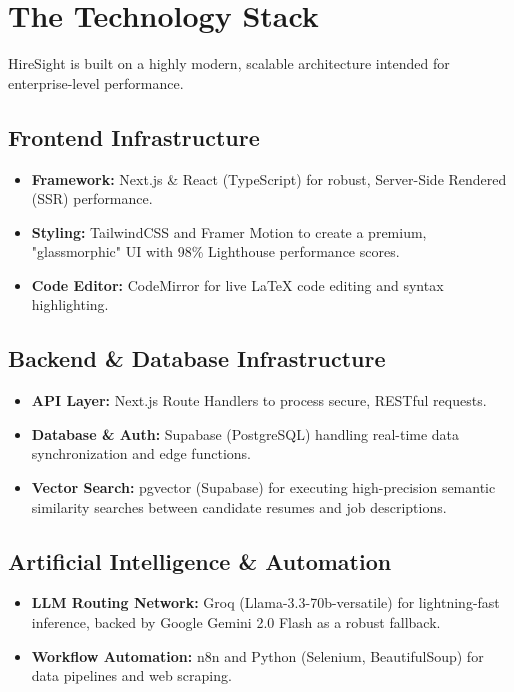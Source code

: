\documentclass[12pt, a4paper]{article}
\begin{document}
\section{The Technology Stack}
HireSight is built on a highly modern, scalable architecture intended for enterprise-level performance.

\subsection{Frontend Infrastructure}
\begin{itemize}
    \item \textbf{Framework:} Next.js \& React (TypeScript) for robust, Server-Side Rendered (SSR) performance.
    \item \textbf{Styling:} TailwindCSS and Framer Motion to create a premium, "glassmorphic" UI with 98\% Lighthouse performance scores.
    \item \textbf{Code Editor:} CodeMirror for live LaTeX code editing and syntax highlighting.
\end{itemize}

\subsection{Backend \& Database Infrastructure}
\begin{itemize}
    \item \textbf{API Layer:} Next.js Route Handlers to process secure, RESTful requests.
    \item \textbf{Database \& Auth:} Supabase (PostgreSQL) handling real-time data synchronization and edge functions.
    \item \textbf{Vector Search:} pgvector (Supabase) for executing high-precision semantic similarity searches between candidate resumes and job descriptions.
\end{itemize}

\subsection{Artificial Intelligence \& Automation}
\begin{itemize}
    \item \textbf{LLM Routing Network:} Groq (Llama-3.3-70b-versatile) for lightning-fast inference, backed by Google Gemini 2.0 Flash as a robust fallback.
    \item \textbf{Workflow Automation:} n8n and Python (Selenium, BeautifulSoup) for data pipelines and web scraping.
\end{itemize}
\end{document}
